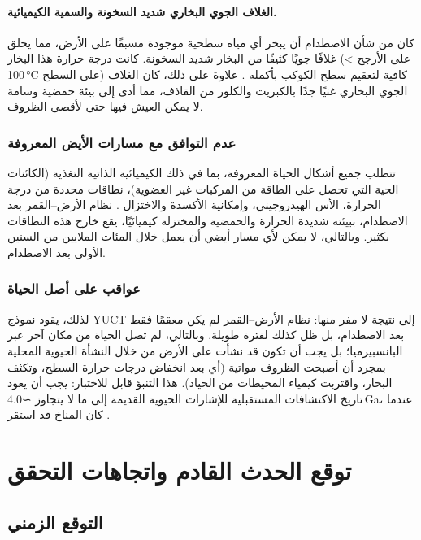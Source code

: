 \documentclass[11pt,a4paper]{article}
\begin{document}
	\paragraph{الغلاف الجوي البخاري شديد السخونة والسمية الكيميائية.}
	كان من شأن الاصطدام أن يبخر أي مياه سطحية موجودة مسبقًا على الأرض، مما يخلق غلافًا جويًا كثيفًا من البخار شديد السخونة. كانت درجة حرارة هذا البخار (على الأرجح > 100 °C على السطح) كافية لتعقيم سطح الكوكب بأكمله \cite{Zahnle2015}. علاوة على ذلك، كان الغلاف الجوي البخاري غنيًا جدًا بالكبريت والكلور من القاذف، مما أدى إلى بيئة حمضية وسامة لا يمكن العيش فيها حتى لأقصى الظروف.
	
	\subsubsection{عدم التوافق مع مسارات الأيض المعروفة}
	
	تتطلب جميع أشكال الحياة المعروفة، بما في ذلك الكيميائية الذاتية التغذية (الكائنات الحية التي تحصل على الطاقة من المركبات غير العضوية)، نطاقات محددة من درجة الحرارة، الأس الهيدروجيني، وإمكانية الأكسدة والاختزال \cite{Chemolithoautotroph}. نظام الأرض–القمر بعد الاصطدام، ببيئته شديدة الحرارة والحمضية والمختزلة كيميائيًا، يقع خارج هذه النطاقات بكثير. وبالتالي، لا يمكن لأي مسار أيضي أن يعمل خلال المئات الملايين من السنين الأولى بعد الاصطدام.
	
	\subsubsection{عواقب على أصل الحياة}
	
	لذلك، يقود نموذج YUCT إلى نتيجة لا مفر منها: نظام الأرض–القمر لم يكن معقمًا فقط بعد الاصطدام، بل ظل كذلك لفترة طويلة. وبالتالي، لم تصل الحياة من مكان آخر عبر البانسبيرميا؛ بل يجب أن تكون قد نشأت على الأرض من خلال النشأة الحيوية المحلية بمجرد أن أصبحت الظروف مواتية (أي بعد انخفاض درجات حرارة السطح، وتكثف البخار، واقتربت كيمياء المحيطات من الحياد). هذا التنبؤ قابل للاختبار: يجب أن يعود تاريخ الاكتشافات المستقبلية للإشارات الحيوية القديمة إلى ما لا يتجاوز ∼4.0 Ga، عندما كان المناخ قد استقر \cite{AbiogenesisReview}.
	
	\section{توقع الحدث القادم واتجاهات التحقق}
	
	\subsection{التوقع الزمني}
	
\end{document}
